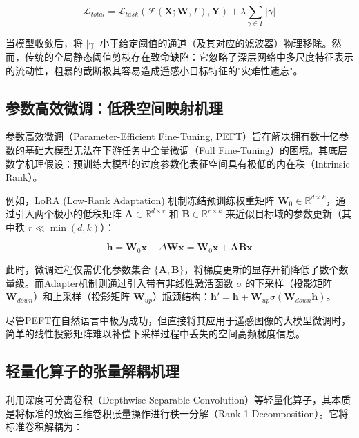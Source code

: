 \begin{equation}
\mathcal{L}_{total} = \mathcal{L}_{task}(\mathcal{F}(\mathbf{X}; \mathbf{W}, \Gamma), \mathbf{Y}) + \lambda \sum_{\gamma \in \Gamma} |\gamma|
\end{equation}

当模型收敛后，将 $|\gamma|$ 小于给定阈值的通道（及其对应的滤波器）物理移除。然而，传统的全局静态阈值剪枝存在致命缺陷：它忽略了深层网络中多尺度特征表示的流动性，粗暴的截断极其容易造成遥感小目标特征的"灾难性遗忘"。

\subsection{参数高效微调：低秩空间映射机理}

参数高效微调（Parameter-Efficient Fine-Tuning, PEFT）旨在解决拥有数十亿参数的基础大模型无法在下游任务中全量微调（Full Fine-Tuning）的困境。其底层数学机理假设：预训练大模型的过度参数化表征空间具有极低的内在秩（Intrinsic Rank）。

例如，LoRA (Low-Rank Adaptation) 机制冻结预训练权重矩阵 $\mathbf{W}_0 \in \mathbb{R}^{d \times k}$，通过引入两个极小的低秩矩阵 $\mathbf{A} \in \mathbb{R}^{d \times r}$ 和 $\mathbf{B} \in \mathbb{R}^{r \times k}$ 来近似目标域的参数更新（其中秩 $r \ll \min(d, k)$）：

\begin{equation}
\mathbf{h} = \mathbf{W}_0 \mathbf{x} + \Delta \mathbf{W} \mathbf{x} = \mathbf{W}_0 \mathbf{x} + \mathbf{A} \mathbf{B} \mathbf{x}
\end{equation}

此时，微调过程仅需优化参数集合 $\{\mathbf{A}, \mathbf{B}\}$，将梯度更新的显存开销降低了数个数量级。而Adapter机制则通过引入带有非线性激活函数 $\sigma$ 的下采样（投影矩阵 $\mathbf{W}_{down}$）和上采样（投影矩阵 $\mathbf{W}_{up}$）瓶颈结构：$\mathbf{h}' = \mathbf{h} + \mathbf{W}_{up}\sigma(\mathbf{W}_{down}\mathbf{h})$。

尽管PEFT在自然语言中极为成功，但直接将其应用于遥感图像的大模型微调时，简单的线性投影矩阵难以补偿下采样过程中丢失的空间高频梯度信息。

\subsection{轻量化算子的张量解耦机理}

利用深度可分离卷积（Depthwise Separable Convolution）等轻量化算子，其本质是将标准的致密三维卷积张量操作进行秩一分解（Rank-1 Decomposition）。它将标准卷积解耦为：

